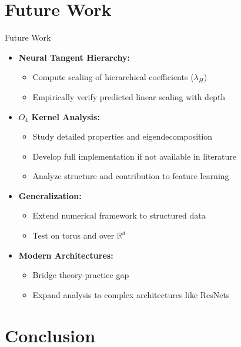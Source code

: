 \documentclass{beamer}
\begin{document}
\section{Future Work}
\begin{frame}{Future Work}
\begin{itemize}
    \item \textbf{Neural Tangent Hierarchy:}
    \begin{itemize}
        \item Compute scaling of hierarchical coefficients ($\lambda_H$)
        \item Empirically verify predicted linear scaling with depth
    \end{itemize}
    
    \item \textbf{$O_4$ Kernel Analysis:}
    \begin{itemize}
        \item Study detailed properties and eigendecomposition
        \item Develop full implementation if not available in literature
        \item Analyze structure and contribution to feature learning
    \end{itemize}
    
    \item \textbf{Generalization:}
    \begin{itemize}
        \item Extend numerical framework to structured data
        \item Test on torus and over $\mathbb{R}^d$
    \end{itemize}
    
    \item \textbf{Modern Architectures:}
    \begin{itemize}
        \item Bridge theory-practice gap
        \item Expand analysis to complex architectures like ResNets
    \end{itemize}
\end{itemize}
\end{frame}

\section{Conclusion}
\end{document}
